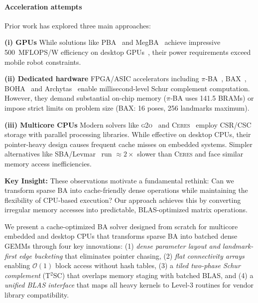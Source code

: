 \paragraph*{Acceleration attempts} Prior work has explored three main approaches:

\textbf{(i) GPUs} While solutions like PBA~\cite{wu2011multicore} and MegBA~\cite{ren2022megba} achieve impressive 
500~MFLOPS/W efficiency on desktop GPUs~\cite{hansch2016modern}, their power requirements exceed mobile robot constraints.

\textbf{(ii) Dedicated hardware} FPGA/ASIC accelerators including $\pi$‑BA~\cite{qin2019pi}, BAX~\cite{sun2020bax}, 
BOHA~\cite{liu2023boha} and Archytas~\cite{liu2021archytas} enable millisecond-level Schur complement computation. 
However, they demand substantial on-chip memory ($\pi$‑BA uses 141.5 BRAMs) or impose strict limits on problem size 
(BAX: 16 poses, 256 landmarks maximum).

\textbf{(iii) Multicore CPUs} Modern solvers like \textsc{g2o}~\cite{kummerle2011g} and \textsc{Ceres}~\cite{agarwal2012ceres} 
employ CSR/CSC storage with parallel processing libraries. While effective on desktop CPUs, their pointer-heavy design 
causes frequent cache misses on embedded systems. Simpler alternatives like SBA/Levmar~\cite{lourakis2009sba} run 
$\approx2\times$ slower than \textsc{Ceres} and face similar memory access inefficiencies.

\textbf{Key Insight:} These observations motivate a fundamental rethink: Can we transform sparse BA into cache-friendly 
dense operations while maintaining the flexibility of CPU-based execution? Our approach achieves this by converting 
irregular memory accesses into predictable, BLAS-optimized matrix operations.

We present a cache-optimized BA solver designed from scratch for multicore embedded and desktop CPUs that transforms sparse BA into 
batched dense GEMMs through four key innovations: (1) \emph{dense parameter layout and landmark-first edge bucketing} 
that eliminates pointer chasing, (2) \emph{flat connectivity arrays} enabling $\mathcal{O}(1)$ block access without 
hash tables, (3) a \emph{tiled two-phase Schur complement} (T$^{2}$SC) that overlaps memory staging with batched BLAS, 
and (4) a \emph{unified BLAS interface} that maps all heavy kernels to Level-3 routines for vendor library compatibility.

